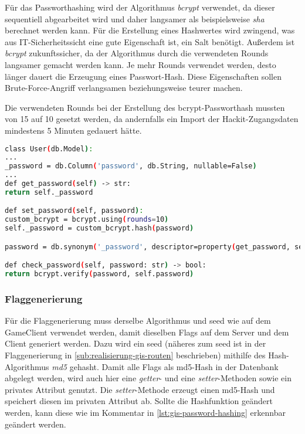 Für das Passworthashing wird der Algorithmus \textit{bcrypt} verwendet, da dieser sequentiell abgearbeitet wird und daher langsamer als beispielsweise  \textit{sha} berechnet werden kann. Für die Erstellung eines Hashwertes wird zwingend, was aus IT-Sicherheitssicht eine gute Eigenschaft ist, ein Salt benötigt. Außerdem ist \textit{bcrypt} zukunftssicher, da der Algorithmus durch die verwendeten Rounds langsamer gemacht werden kann. Je mehr Rounds verwendet werden, desto länger dauert die Erzeugung eines Passwort-Hash. Diese Eigenschaften sollen Brute-Force-Angriff verlangsamen beziehungsweise teurer machen.

Die verwendeten Rounds bei der Erstellung des bcrypt-Passworthash mussten von 15 auf 10 gesetzt werden, da andernfalls ein Import der Hackit-Zugangsdaten mindestens 5 Minuten gedauert hätte.

\begin{lstlisting}[language=bash, frame=single, caption={GIS Nutzerpasswort}, captionpos=b, label={lst:gis-orm-user-pw-hash}]
class User(db.Model):
...
_password = db.Column('password', db.String, nullable=False)
...
def get_password(self) -> str:
return self._password

def set_password(self, password):
custom_bcrypt = bcrypt.using(rounds=10)
self._password = custom_bcrypt.hash(password)

password = db.synonym('_password', descriptor=property(get_password, set_password))

def check_password(self, password: str) -> bool:
return bcrypt.verify(password, self.password)
\end{lstlisting}

\subsubsection{Flaggenerierung}\label{subsub:realisierung-gis-flag-hash}
Für die Flaggenerierung muss derselbe Algorithmus und seed wie auf dem GameClient verwendet werden, damit dieselben Flags auf dem Server und dem Client generiert werden. Dazu wird ein seed (näheres zum seed ist in der Flaggenerierung in \autoref{sub:realisierung-gis-routen} beschrieben) mithilfe des Hash-Algorithmus \textit{md5} gehasht. Damit alle Flags als md5-Hash in der Datenbank abgelegt werden, wird auch hier eine \textit{getter}- und eine \textit{setter}-Methoden sowie ein privates Attribut genutzt. Die \textit{setter}-Methode erzeugt einen md5-Hash und speichert diesen im privaten Attribut ab. Sollte die Hashfunktion geändert werden, kann diese wie im Kommentar in \autoref{lst:gis-password-hashing} erkennbar geändert werden.

